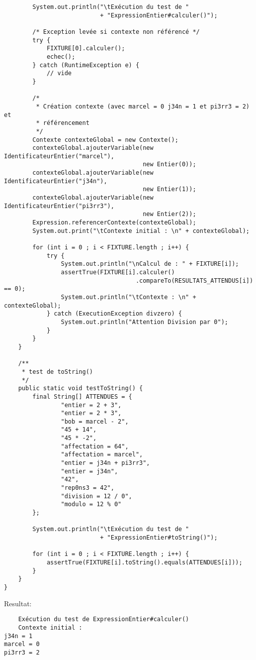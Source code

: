 \begin{enum}
\begin{verbatim}
        System.out.println("\tExécution du test de "
                           + "ExpressionEntier#calculer()");
        
        /* Exception levée si contexte non référencé */
        try {
            FIXTURE[0].calculer();
            echec();
        } catch (RuntimeException e) {
            // vide
        }
        
        /* 
         * Création contexte (avec marcel = 0 j34n = 1 et pi3rr3 = 2) et 
         * référencement 
         */
        Contexte contexteGlobal = new Contexte();
        contexteGlobal.ajouterVariable(new IdentificateurEntier("marcel"),
                                       new Entier(0));
        contexteGlobal.ajouterVariable(new IdentificateurEntier("j34n"),
                                       new Entier(1));
        contexteGlobal.ajouterVariable(new IdentificateurEntier("pi3rr3"),
                                       new Entier(2));
        Expression.referencerContexte(contexteGlobal);
        System.out.print("\tContexte initial : \n" + contexteGlobal);
        
        for (int i = 0 ; i < FIXTURE.length ; i++) {
            try {
                System.out.println("\nCalcul de : " + FIXTURE[i]);
                assertTrue(FIXTURE[i].calculer()
                                     .compareTo(RESULTATS_ATTENDUS[i]) == 0);
                System.out.println("\tContexte : \n" + contexteGlobal);
            } catch (ExecutionException divzero) {
                System.out.println("Attention Division par 0");
            }
        }
    }
    
    /**
     * test de toString()
     */
    public static void testToString() {
        final String[] ATTENDUES = {
                "entier = 2 + 3",
                "entier = 2 * 3",
                "bob = marcel - 2",
                "45 + 14",
                "45 * -2",
                "affectation = 64",
                "affectation = marcel",
                "entier = j34n + pi3rr3",
                "entier = j34n",
                "42",
                "rep0ns3 = 42",
                "division = 12 / 0",
                "modulo = 12 % 0"
        };
        
        System.out.println("\tExécution du test de "
                           + "ExpressionEntier#toString()");
        
        for (int i = 0 ; i < FIXTURE.length ; i++) {
            assertTrue(FIXTURE[i].toString().equals(ATTENDUES[i]));
        }
    }
}
\end{verbatim}
Resultat:
\begin{verbatim}
    Exécution du test de ExpressionEntier#calculer()
    Contexte initial : 
j34n = 1
marcel = 0
pi3rr3 = 2


\end{verbatim}
\end{enum}
